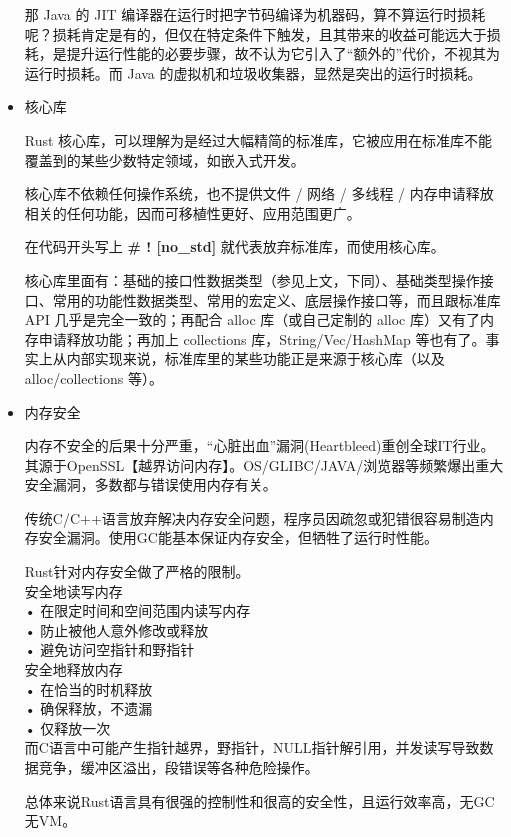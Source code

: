 \documentclass[12pt, a4paper]{article}
\begin{document}
\begin{itemize}
		那 Java 的 JIT 编译器在运行时把字节码编译为机器码，算不算运行时损耗呢？损耗肯定是有的，但仅在特定条件下触发，且其带来的收益可能远大于损耗，是提升运行性能的必要步骤，故不认为它引入了“额外的”代价，不视其为运行时损耗。而 Java 的虚拟机和垃圾收集器，显然是突出的运行时损耗。
		
		\item 核心库
		
		Rust 核心库，可以理解为是经过大幅精简的标准库，它被应用在标准库不能覆盖到的某些少数特定领域，如嵌入式开发。
		
		核心库不依赖任何操作系统，也不提供文件 / 网络 / 多线程 / 内存申请释放相关的任何功能，因而可移植性更好、应用范围更广。
		
		在代码开头写上 \textbf{\# ! [no\_std] }就代表放弃标准库，而使用核心库。
		
		核心库里面有：基础的接口性数据类型（参见上文，下同）、基础类型操作接口、常用的功能性数据类型、常用的宏定义、底层操作接口等，而且跟标准库 API 几乎是完全一致的；再配合 alloc 库（或自己定制的 alloc 库）又有了内存申请释放功能；再加上 collections 库，String/Vec/HashMap 等也有了。事实上从内部实现来说，标准库里的某些功能正是来源于核心库（以及 alloc/collections 等）。
		
		\item 内存安全
		
		内存不安全的后果十分严重，“心脏出血”漏洞(Heartbleed)重创全球IT行业。其源于OpenSSL【越界访问内存】。OS/GLIBC/JAVA/浏览器等频繁爆出重大安全漏洞，多数都与错误使用内存有关。
		
		传统C/C++语言放弃解决内存安全问题，程序员因疏忽或犯错很容易制造内存安全漏洞。使用GC能基本保证内存安全，但牺牲了运行时性能。
		
		Rust针对内存安全做了严格的限制。\\
		安全地读写内存\\
		• 在限定时间和空间范围内读写内存\\
		• 防止被他人意外修改或释放\\
		• 避免访问空指针和野指针\\
		安全地释放内存\\
		• 在恰当的时机释放\\
		• 确保释放，不遗漏\\
		• 仅释放一次\\
		而C语言中可能产生指针越界，野指针，NULL指针解引用，并发读写导致数据竞争，缓冲区溢出，段错误等各种危险操作。
		
		总体来说Rust语言具有很强的控制性和很高的安全性，且运行效率高，无GC无VM。
	\end{itemize}
	
\end{document}
